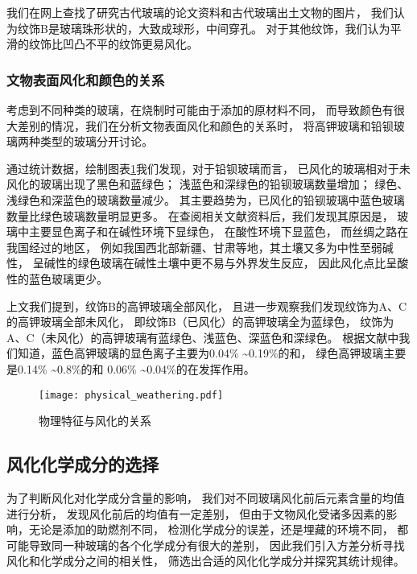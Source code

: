 我们在网上查找了研究古代玻璃的论文资料和古代玻璃出土文物的图片，
我们认为纹饰B是玻璃珠形状的，大致成球形，中间穿孔\cite{yunnanluliangxianxueguanbao}。
对于其他纹饰，我们认为平滑的纹饰比凹凸不平的纹饰更易风化\cite{zhanguojihandai}\cite{zhongguozhanhanqian}\cite{shanxilintongxinfeng}。

\subsubsection{文物表面风化和颜色的关系}

考虑到不同种类的玻璃，在烧制时可能由于添加的原材料不同，
而导致颜色有很大差别的情况，我们在分析文物表面风化和颜色的关系时，
将高钾玻璃和铅钡玻璃两种类型的玻璃分开讨论。

通过统计数据，绘制图表\ref{bb}我们发现，对于铅钡玻璃而言，
已风化的玻璃相对于未风化的玻璃出现了黑色和蓝绿色；
浅蓝色和深绿色的铅钡玻璃数量增加；
绿色、浅绿色和深蓝色的玻璃数量减少。
其主要趋势为，已风化的铅钡玻璃中蓝色玻璃数量比绿色玻璃数量明显更多。
在查阅相关文献资料后，我们发现其原因是，
玻璃中主要显色离子和在碱性环境下显绿色，
在酸性环境下显蓝色\cite{yijianzhanguoshiqibaleng}\cite{hunanyuanshuiliuyu}，
而丝绸之路在我国经过的地区，
例如我国西北部新疆、甘肃等地，其土壤又多为中性至弱碱性，
呈碱性的绿色玻璃在碱性土壤中更不易与外界发生反应，
因此风化点比呈酸性的蓝色玻璃更少。

上文我们提到，纹饰B的高钾玻璃全部风化，
且进一步观察我们发现纹饰为A、C的高钾玻璃全部未风化，
即纹饰B（已风化）的高钾玻璃全为蓝绿色，
纹饰为A、C（未风化）的高钾玻璃有蓝绿色、浅蓝色、深蓝色和深绿色。
根据文献中我们知道，蓝色高钾玻璃的显色离子主要为0.04\% \textasciitilde 0.19\%的和，
绿色高钾玻璃主要是0.14\% \textasciitilde 0.8\%的和
0.06\% \textasciitilde 0.04\%的在发挥作用\cite{wedepohl2010chemical}。


\begin{figure}[!h]
	\centering
	\texttt{[image: physical\_weathering.pdf]}
	\caption{物理特征与风化的关系}
	\label{bb}
\end{figure}


\subsection{风化化学成分的选择}

为了判断风化对化学成分含量的影响，
我们对不同玻璃风化前后元素含量的均值进行分析，
发现风化前后的均值有一定差别，
但由于文物风化受诸多因素的影响，无论是添加的助燃剂不同，
检测化学成分的误差，还是埋藏的环境不同，
都可能导致同一种玻璃的各个化学成分有很大的差别，
因此我们引入方差分析寻找风化和化学成分之间的相关性，
筛选出合适的风化化学成分并探究其统计规律。

